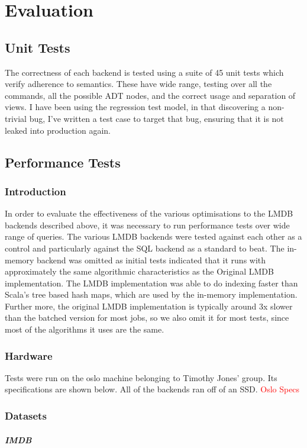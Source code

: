 \documentclass[12pt,a4paper,twoside,openright]{report}
\newcommand\todo[1]{\textcolor{red}{#1}}
\begin{document}
\chapter{Evaluation}
\section{Unit Tests}
The correctness of each backend is tested using a suite of 45 unit tests which verify adherence to semantics. These have  wide range, testing over all the commands, all the possible ADT nodes, and the correct usage and separation of views. I have been using the regression test model, in that discovering a non-trivial bug, I’ve written a test case to target that bug, ensuring that it is not leaked into production again.
\section{Performance Tests}
	\subsection{Introduction}
	In order to evaluate the effectiveness of the various optimisations to the LMDB backends described above, it was necessary to run performance tests over wide range of queries. The various LMDB backends were tested against each other as a control and particularly against the SQL backend as a standard to beat. The in-memory backend was omitted as initial tests indicated that it runs with approximately the same algorithmic characteristics as the Original LMDB implementation. The LMDB implementation was able to do indexing faster than Scala’s tree based hash maps, which are used by the in-memory implementation. Further more, the original LMDB implementation is typically around 3x slower than the batched version for most jobs, so we also omit it for most tests, since most of the algorithms it uses are the same.
	\subsection{Hardware}
	Tests were run on the oslo machine belonging to Timothy Jones’ group. Its specifications are shown below. All of the backends ran off of an SSD.
	\todo{Oslo Specs}
	\subsection{Datasets}
		\paragraph{IMDB}
\end{document}
